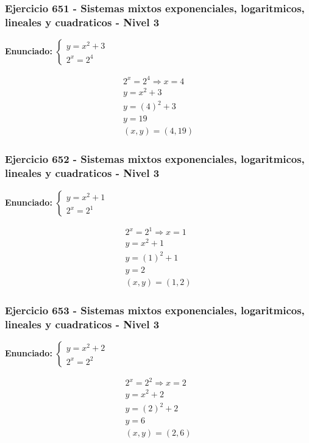 \documentclass[12pt,a4paper]{article}
\begin{document}
\subsubsection*{Ejercicio 651 - Sistemas mixtos exponenciales, logaritmicos, lineales y cuadraticos - Nivel 3}
\textbf{Enunciado:} \(\begin{cases} y=x^2+3\\ 2^x=2^{4}\end{cases}\)

\[
\begin{aligned}
2^x=2^{4}\Rightarrow x=4\\
y=x^2+3\\
y=(4)^2+3\\
y=19\\
\boxed{(x,y)=(4,19)}
\end{aligned}
\]


\subsubsection*{Ejercicio 652 - Sistemas mixtos exponenciales, logaritmicos, lineales y cuadraticos - Nivel 3}
\textbf{Enunciado:} \(\begin{cases} y=x^2+1\\ 2^x=2^{1}\end{cases}\)

\[
\begin{aligned}
2^x=2^{1}\Rightarrow x=1\\
y=x^2+1\\
y=(1)^2+1\\
y=2\\
\boxed{(x,y)=(1,2)}
\end{aligned}
\]


\subsubsection*{Ejercicio 653 - Sistemas mixtos exponenciales, logaritmicos, lineales y cuadraticos - Nivel 3}
\textbf{Enunciado:} \(\begin{cases} y=x^2+2\\ 2^x=2^{2}\end{cases}\)

\[
\begin{aligned}
2^x=2^{2}\Rightarrow x=2\\
y=x^2+2\\
y=(2)^2+2\\
y=6\\
\boxed{(x,y)=(2,6)}
\end{aligned}
\]
\end{document}
